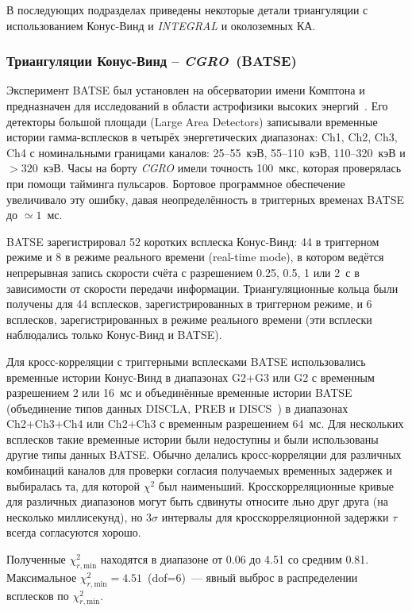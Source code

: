 В последующих подразделах приведены некоторые детали триангуляции с использованием 
Конус-Винд и \textit{INTEGRAL} и околоземных КА.

\subsubsection{Триангуляции Конус-Винд -- \textit{CGRO}~(BATSE)}\label{sec:KW_BATSE_cc}
Эксперимент BATSE был установлен на обсерватории имени Комптона и предназначен 
для исследований в области астрофизики высоких энергий~\citep{Fishman_1992NASCP3137}. 
Его детекторы большой площади (Large Area Detectors) записывали временные истории 
гамма-всплесков в четырёх энергетических диапазонах: Ch1, Ch2, Ch3, Ch4 с номинальными 
границами каналов: 25--55~кэВ, 55--110~кэВ, 110--320~кэВ и $>320$~кэВ. 
Часы на борту \textit{CGRO} имели точность 100~мкс, которая проверялась при помощи 
тайминга пульсаров. Бортовое программное обеспечение увеличивало эту ошибку, 
давая неопределённость в триггерных временах BATSE до $\simeq 1$~мс.

BATSE зарегистрировал 52 коротких всплеска Конус-Винд: 44 в триггерном режиме 
и 8 в режиме реального времени (real-time mode), в котором ведётся непрерывная 
запись скорости счёта с разрешением 0.25, 0.5, 1 или 2~с в зависимости от скорости 
передачи информации. Триангуляционные кольца были получены для 44 всплесков, 
зарегистрированных в триггерном режиме, и 6 всплесков, зарегистрированных в 
режиме реального времени (эти всплески наблюдались только Конус-Винд и BATSE).

Для кросс-корреляции с триггерными всплесками BATSE использовались временные 
истории Конус-Винд в диапазонах G2+G3 или G2 с временным разрешением 2 или 16~мс 
и объединённые временные истории BATSE (объединение типов данных DISCLA, PREB 
и DISCS~\citealt{Fishman_1992NASCP3137}) в диапазонах Ch2+Ch3+Ch4 или Ch2+Ch3 
с временным разрешением 64~мс. Для нескольких всплесков такие временные истории 
были недоступны и были использованы другие типы данных BATSE. Обычно делались 
кросс-корреляции для различных комбинаций каналов для проверки согласия 
получаемых временных задержек и выбиралась та, для которой $\chi^2$ был наименьший. 
Кросскорреляционные кривые для различных диапазонов могут быть сдвинуты относите
льно друг друга (на несколько миллисекунд), но $3\sigma$ интервалы для 
кросскорреляционной задержки $\tau$ всегда согласуются хорошо.

Полученные $\chi^2_{r,\textrm{min}}$ находятся в диапазоне от 0.06 до 4.51 со 
средним 0.81. Максимальное $\chi^2_{r,\textrm{min}}=4.51$~(dof=6)~--- явный выброс 
в распределении всплесков по $\chi^2_{r,\textrm{min}}$.

